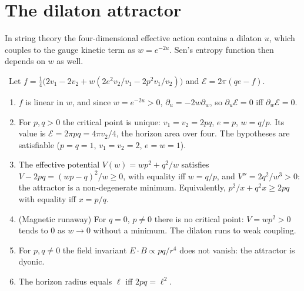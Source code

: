 \section{The dilaton attractor}

In string theory the four-dimensional effective action contains a dilaton $u$, which couples to the gauge kinetic term as $w=e^{-2u}$. Sen's entropy function then depends on $w$ as well.

\begin{theorem}\label{thm:stringattractor}\ver\
Let $f=\frac14\bigl(2v_1-2v_2+w(2e^2v_2/v_1-2p^2v_1/v_2)\bigr)$ and $\mathcal E=2\pi(qe-f)$.
\begin{enumerate}[label=(\roman*)]
\item $f$ is linear in $w$, and since $w=e^{-2u}>0$, $\partial_u=-2w\partial_w$, so $\partial_u\mathcal E=0$ iff $\partial_w\mathcal E=0$.
\item For $p,q>0$ the critical point is unique: $v_1=v_2=2pq$, $e=p$, $w=q/p$. Its value is $\mathcal E=2\pi pq=4\pi v_2/4$, the horizon area over four. The hypotheses are satisfiable ($p=q=1$, $v_1=v_2=2$, $e=w=1$).
\item The effective potential $V(w)=wp^2+q^2/w$ satisfies $V-2pq=(wp-q)^2/w\ge0$, with equality iff $w=q/p$, and $V''=2q^2/w^3>0$: the attractor is a non-degenerate minimum. Equivalently, $p^2/x+q^2x\ge2pq$ with equality iff $x=p/q$.
\item (Magnetic runaway) For $q=0$, $p\ne0$ there is no critical point: $V=wp^2>0$ tends to $0$ as $w\to0$ without a minimum. The dilaton runs to weak coupling.
\item For $p,q\ne0$ the field invariant $E\cdot B\propto pq/r^4$ does not vanish: the attractor is dyonic.
\item The horizon radius equals $\ell$ iff $2pq=\ell^2$.
\end{enumerate}
\end{theorem}
